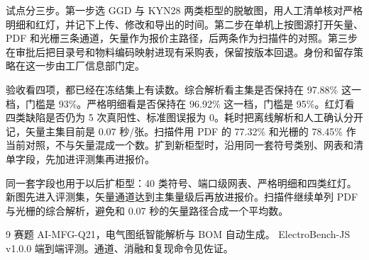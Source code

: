试点分三步。第一步选 GGD 与 KYN28 两类柜型的脱敏图，用人工清单核对严格明细和红灯，并记下上传、修改和导出的时间。第二步在单机上按图源打开矢量、PDF 和光栅三条通道，矢量作为报价主路径，后两条作为扫描件的对照。第三步在审批后把目录号和物料编码映射进现有采购表，保留按版本回退。身份和留存策略在这一步由工厂信息部门定。

验收看四项，都已经在冻结集上有读数。综合解析看主集是否保持在 97.88\% 这一档，门槛是 93\%。严格明细看是否保持在 96.92\% 这一档，门槛是 95\%。红灯看四类缺陷是否仍为 5 次真阳性、标准图误报为 0。耗时把离线解析和人工确认分开记，矢量主集目前是 0.07 秒/张。扫描件用 PDF 的 77.32\% 和光栅的 78.45\% 作当前对照，不与矢量混成一个数。扩到新柜型时，沿用同一套符号类别、网表和清单字段，先加进评测集再进报价。

同一套字段也用于以后扩柜型：40 类符号、端口级网表、严格明细和四类红灯。新图先进入评测集，矢量通道达到主集量级后再放进报价。扫描件继续单列 PDF 与光栅的综合解析，避免和 0.07 秒的矢量路径合成一个平均数。

\begin{thebibliography}{9}
 赛题 AI-MFG-Q21，电气图纸智能解析与 BOM 自动生成。
 ElectroBench-JS v1.0.0 端到端评测。通道、消融和复现命令见佐证。
\end{thebibliography}


